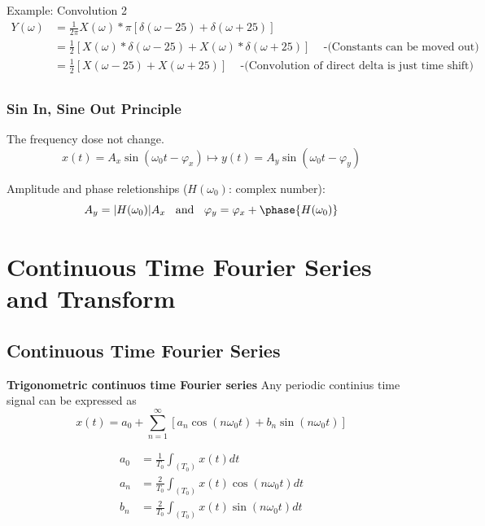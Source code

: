 \begin{exampleblock}{Example: Convolution 2}
\begin{align*}
    Y(\omega) &= \frac{1}{2\pi}X(\omega) * \pi [\delta(\omega-25)+\delta(\omega+25)] \\
    &= \frac{1}{2}[X(\omega)*\delta(\omega-25) + X(\omega)*\delta(\omega+25)] \;\;\; \text{ -(Constants can be moved out)} \\
    &= \frac{1}{2}[X(\omega-25) + X(\omega+25)] \;\;\; \text{ -(Convolution of direct delta is just time shift)} \\
\end{align*}    
\end{exampleblock}



\subsubsection{Sin In, Sine Out Principle}
The frequency dose not change.
\begin{equation}
    x(t)=A_x\sin(\omega_0t-\varphi_x) \mapsto y(t)=A_y\sin(\omega_0t-\varphi_y)
\end{equation}

Amplitude and phase reletionships ($H(\omega_0)$: complex number):
\begin{equation}
    A_y=|H(\omega_0)|A_x \;\; \text{ and } \;\; \varphi_y=\varphi_x+\phase{H(\omega_0)}
\end{equation}


\newpage

\section{Continuous Time Fourier Series and Transform}
\subsection{Continuous Time Fourier Series}
\textbf{Trigonometric continuos time Fourier series}
Any periodic continius time signal can be expressed as
\begin{equation*}
    x(t) = a_0 + \sum_{n=1}^{\infty} [a_n\cos(n\omega_0t) + b_n\sin(n\omega_0t)]
\end{equation*}

\begin{align*}
    a_0 &= \frac{1}{T_0}\int_{(T_0)} x(t) dt \\
    a_n &= \frac{2}{T_0}\int_{(T_0)} x(t)\cos(n\omega_0t) dt \\
    b_n &= \frac{2}{T_0}\int_{(T_0)} x(t)\sin(n\omega_0t) dt \\
\end{align*}


